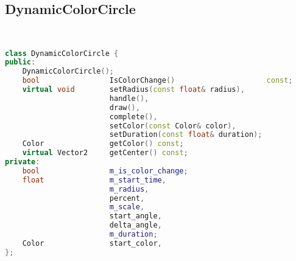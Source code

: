 \subsection{DynamicColorCircle}
\begin{lstlisting}[language=C++]


class DynamicColorCircle {
public:
    DynamicColorCircle();
    bool                IsColorChange()                     const;
    virtual void        setRadius(const float& radius),
                        handle(),
                        draw(),
                        complete(),
                        setColor(const Color& color),
                        setDuration(const float& duration);
    Color               getColor() const;
    virtual Vector2     getCenter() const;
private:
    bool                m_is_color_change;
    float               m_start_time,
                        m_radius,
                        percent,
                        m_scale,
                        start_angle,
                        delta_angle,
                        m_duration;
    Color               start_color,
};






\end{lstlisting}
